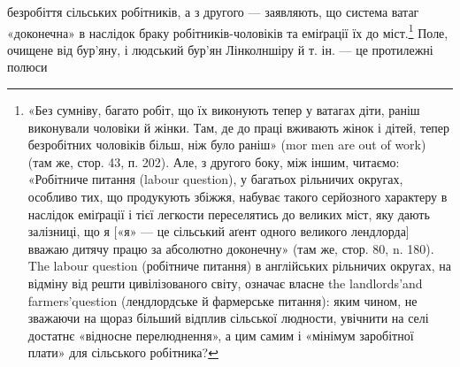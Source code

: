 \parcont{}  %
безробіття сільських робітників, а з другого — заявляють, що
система ватаг «доконечна» в наслідок браку робітників-чоловіків
та еміґрації їх до міст.\footnote{
«Без сумніву, багато робіт, що їх виконують тепер у ватагах
діти, раніш виконували чоловіки й жінки. Там, де до праці вживають
жінок і дітей, тепер безробітних чоловіків більш, ніж було раніш» (mor
men are out of work) (там же, стор. 43, п. 202). Але, з другого боку, між
іншим, читаємо: «Робітниче питання (labour question), у багатьох рільничих
округах, особливо тих, що продукують збіжжя, набуває такого
серйозного характеру в наслідок еміґрації і тієї легкости переселятись
до великих міст, яку дають залізниці, що я [«я» — це сільський аґент
одного великого лендлорда] вважаю дитячу працю за абсолютно доконечну»
(там же, стор. 80, n. 180). The labour question (робітниче питання)
в англійських рільничих округах, на відміну від решти цивілізованого
світу, означає власне the landlords’and farmers’question (лендлордське
й фармерське питання): яким чином, не зважаючи на щораз більший
відплив сільської людности, увічнити на селі достатнє «відносне перелюднення»,
а цим самим і «мінімум заробітної плати» для сільського
робітника?
} Поле, очищене від бур’яну, і людський
бур’ян Лінколншіру й т. ін. — це протилежні полюси

